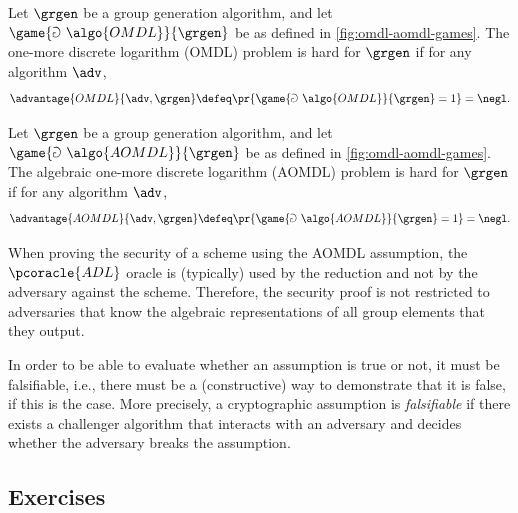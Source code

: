 \begin{definition}
  Let $\grgen$ be a group generation algorithm, and let $\game{\Game~\algo{OMDL}}{\grgen}$ be as defined in \autoref{fig:omdl-aomdl-games}.
  The one-more discrete logarithm (OMDL) problem is hard for $\grgen$ if for any \ppt algorithm $\adv$,
  \[
  \advantage{OMDL}{\adv, \grgen} \defeq \pr{\game{\Game~\algo{OMDL}}{\grgen} = 1} = \negl.
  \]
\end{definition}

\begin{definition}
  Let $\grgen$ be a group generation algorithm, and let $\game{\Game~\algo{AOMDL}}{\grgen}$ be as defined in \autoref{fig:omdl-aomdl-games}.
  The algebraic one-more discrete logarithm (AOMDL) problem is hard for $\grgen$ if for any \ppt algorithm $\adv$,
  \[
  \advantage{AOMDL}{\adv, \grgen} \defeq \pr{\game{\Game~\algo{AOMDL}}{\grgen} = 1} = \negl.
  \]
\end{definition}

\begin{remark}
  When proving the security of a scheme using the AOMDL assumption, the $\pcoracle{ADL}$ oracle is (typically) used by the reduction and not by the adversary against the scheme.
  Therefore, the security proof is not restricted to adversaries that know the algebraic representations of all group elements that they output.
\end{remark}

\begin{remark}
  In order to be able to evaluate whether an assumption is true or not, it must be falsifiable, i.e., there must be a (constructive) way to demonstrate that it is false, if this is the case.
  More precisely, a cryptographic assumption is \emph{falsifiable} if there exists a \ppt challenger algorithm that interacts with an adversary and decides whether the adversary breaks the assumption.
\end{remark}

\subsection{Exercises}


